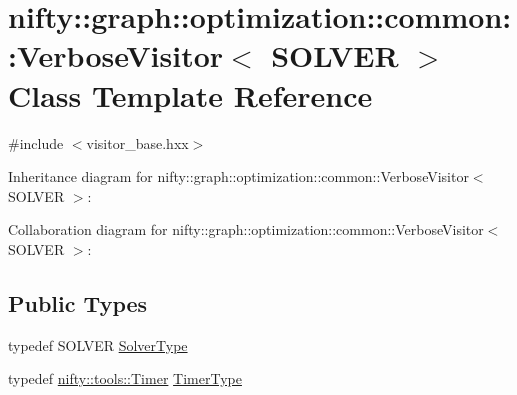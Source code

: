\hypertarget{classnifty_1_1graph_1_1optimization_1_1common_1_1VerboseVisitor}{}\section{nifty\+:\+:graph\+:\+:optimization\+:\+:common\+:\+:Verbose\+Visitor$<$ S\+O\+L\+V\+E\+R $>$ Class Template Reference}
\label{classnifty_1_1graph_1_1optimization_1_1common_1_1VerboseVisitor}


{\ttfamily \#include $<$visitor\+\_\+base.\+hxx$>$}



Inheritance diagram for nifty\+:\+:graph\+:\+:optimization\+:\+:common\+:\+:Verbose\+Visitor$<$ S\+O\+L\+V\+E\+R $>$\+:


Collaboration diagram for nifty\+:\+:graph\+:\+:optimization\+:\+:common\+:\+:Verbose\+Visitor$<$ S\+O\+L\+V\+E\+R $>$\+:
\subsection*{Public Types}
\begin{DoxyCompactItemize}
\item 
typedef S\+O\+L\+V\+E\+R \hyperlink{classnifty_1_1graph_1_1optimization_1_1common_1_1VerboseVisitor_a5aa8c805242bf435548e2367674092d3}{Solver\+Type}
\item 
typedef \hyperlink{classnifty_1_1tools_1_1Timer}{nifty\+::tools\+::\+Timer} \hyperlink{classnifty_1_1graph_1_1optimization_1_1common_1_1VerboseVisitor_a2b974614fdd9abcb04d4b479d6c1ce00}{Timer\+Type}
\end{DoxyCompactItemize}
